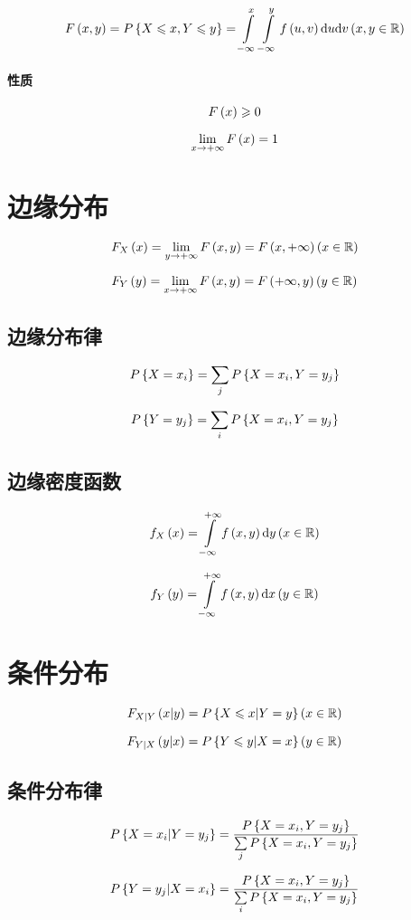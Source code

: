 \documentclass{article}
\begin{document}
\[F\left(x,y\right)=P\left\{X\leqslant x,Y\leqslant y\right\}=\int\limits_{-\infty}^x\int\limits_{-\infty}^yf\left(u,v\right)\mathrm d u\mathrm d v\left(x,y\in\mathbb R\right)\]

\paragraph{性质}

\[F\left(x\right)\geqslant0\]

\[\lim_{x\to+\infty}F\left(x\right)=1\]

\section{边缘分布}

\[F_X\left(x\right)=\lim_{y\to+\infty}F\left(x,y\right)=F\left(x,+\infty\right)\left(x\in\mathbb R\right)\]

\[F_Y\left(y\right)=\lim_{x\to+\infty}F\left(x,y\right)=F\left(+\infty,y\right)\left(y\in\mathbb R\right)\]

\subsection{边缘分布律}

\[P\left\{X=x_i\right\}=\sum_jP\left\{X=x_i,Y=y_j\right\}\]

\[P\left\{Y=y_j\right\}=\sum_iP\left\{X=x_i,Y=y_j\right\}\]

\subsection{边缘密度函数}

\[f_X\left(x\right)=\int\limits_{-\infty}^{+\infty}f\left(x,y\right)\mathrm d y\left(x\in\mathbb R\right)\]

\[f_Y\left(y\right)=\int\limits_{-\infty}^{+\infty}f\left(x,y\right)\mathrm d x\left(y\in\mathbb R\right)\]

\section{条件分布}

\[F_{X|Y}\left(x|y\right)=P\left\{X\leqslant x|Y=y\right\}\left(x\in\mathbb R\right)\]

\[F_{Y|X}\left(y|x\right)=P\left\{Y\leqslant y|X=x\right\}\left(y\in\mathbb R\right)\]

\subsection{条件分布律}

\[P\left\{X=x_i|Y=y_j\right\}=\frac{P\left\{X=x_i,Y=y_j\right\}}{\sum\limits_jP\left\{X=x_i,Y=y_j\right\}}\]

\[P\left\{Y=y_j|X=x_i\right\}=\frac{P\left\{X=x_i,Y=y_j\right\}}{\sum\limits_iP\left\{X=x_i,Y=y_j\right\}}\]
\end{document}
